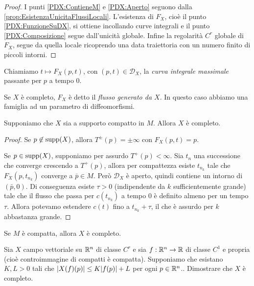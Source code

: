 \begin{proof}
	I punti \ref{PDX:ContieneM} e \ref{PDX:Aperto} seguono dalla \cref{prop:EsistenzaUnicitaFlussiLocali}. L'esistenza di $F_X$, cioè il punto \ref{PDX:FunzioneSuDX}, si ottiene incollando curve integrali e il punto \ref{PDX:Composizione} segue dall'unicità globale.
	Infine la regolarità $C^r$ globale di $F_X$, segue da quella locale ricoprendo una data traiettoria con un numero finito di piccoli intorni.
\end{proof}

\begin{definition}  
	Chiamiamo $t\mapsto F_X(p,t)$, con $(p,t)\in\mathscr D_X$, la \emph{curva integrale massimale} passante per $p$ a tempo 0.
	
	Se $X$ è completo, $F_X$ è detto il \emph{flusso generato da $X$}. In questo caso abbiamo una famiglia ad un parametro di diffeomorfismi.
\end{definition}

\begin{proposition}
	Supponiamo che $X$ sia a supporto compatto in $M$. Allora $X$ è completo.
\end{proposition}

\begin{proof}
	Se $p\not \in\operatorname{supp} (X)$, allora $T^{\pm}(p)=\pm\infty$ con $F_X(p,t)=p$.
	
	Se $p\in\operatorname{supp}(X)$, supponiamo per assurdo $T^+(p)<\infty$. Sia $t_n$ una successione che converge crescendo a $T^+(p)$, allora per compattezza esiste $t_{n_k}$ tale che $F_X(p,t_{n_k})$ converge a $\bar p\in M$.
	Però $\mathscr D_X$ è aperto, quindi contiene un intorno di $(\bar p,0)$.
	Di conseguenza esiste $\tau >0$ (indipendente da $k$ sufficientemente grande) tale che il flusso che passa per $c(t_{n_k})$ a tempo 0 è definito almeno per un tempo $\tau$.
	Allora potevamo estendere $c(t)$ fino a $t_{n_k}+\tau$, il che è assurdo per $k$ abbastanza grande.
\end{proof}


\begin{corollary}
	Se $M$ è compatta, allora $X$ è completo.
\end{corollary}


\begin{exercise}
	Sia $X$ campo vettoriale su $\mathbb R^n$ di classe $C^r$ e sia $f:\mathbb R^n\to \mathbb R$ di classe $C^1$ e propria (cioè controimmagine di compatti è compatta). Supponiamo che esistano $K,L>0$ tali che $\lvert X(f)(p)\rvert\le K\lvert f(p)\rvert+L$ per ogni $p\in\mathbb R^n$.. 
	Dimostrare che $X$ è completo.
\end{exercise}
